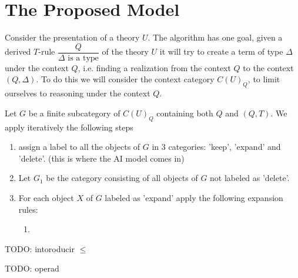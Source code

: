 \chapter{The Proposed Model}

Consider the presentation of a theory $U$.
The algorithm has one goal, given a derived $T$-rule 
$\dfrac{Q}{\Delta \text{ is a type}}$ 
of the theory $U$ it will try to create a term of type $\Delta$
under the context $Q$, i.e. finding a realization from 
the context $Q$ to the context $(Q, \Delta)$.
To do this we will consider the context category $C(U)_Q$,
to limit ourselves to reasoning under the context $Q$. 

Let $G$ be a finite subcategory of $C(U)_Q$ containing both $Q$ and $(Q, T)$.
We apply iteratively the following steps
\begin{enumerate}
    \item assign a label to all the objects of $G$
          in 3 categories: 'keep', 'expand' and 'delete'.
          (this is where the AI model comes in)
    \item Let $G_1$ be the category consisting of all objects of
          $G$ not labeled as 'delete'.
    \item For each object $X$ of $G$ labeled as 'expand' apply the following expansion rules:
        \begin{enumerate}
            \item 
        \end{enumerate}
\end{enumerate}

TODO: intoroducir $\leq$

TODO: operad